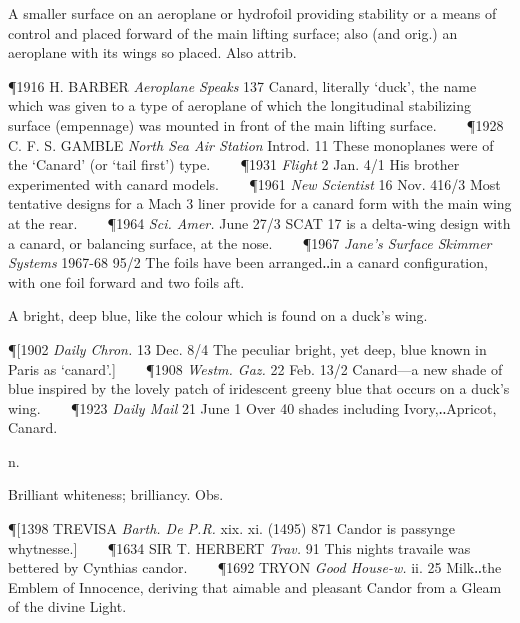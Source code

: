 \begin{description}[wide, labelwidth=!, labelindent=0pt]
\begin{myenumerate}
 A smaller surface on an aeroplane or hydrofoil providing stability or a means of control and placed forward of the main lifting surface; also (and orig.) an aeroplane with its wings so placed. Also attrib.

\P 1916 H. BARBER  \textit{Aeroplane Speaks} 137 Canard, literally ‘duck’, the name which was given to a type of aeroplane of which the longitudinal stabilizing surface (empennage) was mounted in front of the main lifting surface.    
\P 1928 C. F. S.  GAMBLE \textit{North Sea Air Station} Introd. 11 These monoplanes were of the ‘Canard’ (or ‘tail first’) type.    
\P 1931 \textit{Flight}  2 Jan. 4/1 His brother experimented with canard models.    
\P 1961 \textit{New Scientist} 16 Nov. 416/3 Most tentative designs for a Mach 3 liner provide for a canard form with the main wing at the rear.    
\P 1964 \textit{Sci. Amer.} June 27/3 SCAT 17 is a delta-wing design with a canard, or balancing surface, at the nose.    
\P 1967 \textit{Jane's Surface Skimmer Systems} 1967-68 95/2  The foils have been arranged‥in a canard configuration, with one foil forward and two foils aft.

 A bright, deep blue, like the colour which is found on a duck's wing.

\P [1902  \textit{Daily Chron.} 13 Dec. 8/4 The peculiar bright, yet deep, blue known in Paris as ‘canard’.]    
\P 1908 \textit{Westm.  Gaz.} 22 Feb. 13/2 Canard—a new shade of blue inspired by the lovely patch of iridescent greeny blue that occurs on a duck's wing.    
\P 1923  \textit{Daily Mail} 21 June 1 Over 40 shades including Ivory,‥Apricot, Canard.
\end{myenumerate}


 n.

\noindent {}

\vspace{-0.3cm}

\begin{myenumerate}

 Brilliant whiteness; brilliancy. Obs.

\P [1398 TREVISA  \textit{Barth. De P.R.} xix. xi. (1495) 871 Candor is passynge whytnesse.]    
\P 1634 SIR T. HERBERT  \textit{Trav.} 91 This nights travaile was bettered by Cynthias candor.    
\P 1692 TRYON  \textit{Good House-w.} ii. 25 Milk‥the Emblem of Innocence, deriving that aimable and pleasant Candor from a Gleam of the divine Light.


\end{myenumerate}
\end{description}
